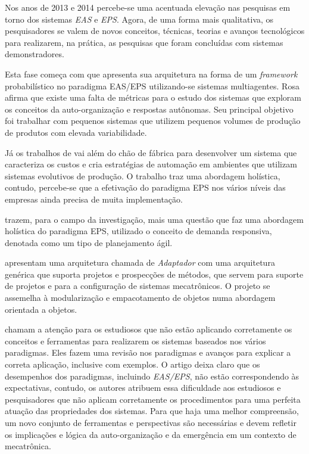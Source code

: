 Nos anos de 2013 e 2014 percebe-se uma acentuada elevação nas pesquisas em torno dos sistemas \textit{EAS} e \textit{EPS}. Agora, de uma forma mais qualitativa, os pesquisadores se valem de novos conceitos, técnicas, teorias e avanços tecnológicos para realizarem, na prática, as pesquisas que foram concluídas com sistemas demonstradores. 

Esta fase começa com \cite{ROSA2013c} que apresenta sua arquitetura na forma de um \textit{framework} probabilístico no paradigma EAS/EPS utilizando-se sistemas multiagentes. Rosa afirma que existe uma falta de métricas para o estudo dos sistemas que exploram os conceitos da auto-organização e respostas autônomas. Seu principal objetivo foi trabalhar com pequenos sistemas que utilizem pequenos volumes de produção de produtos com elevada variabilidade.

Já os trabalhos de \cite{MAFFEI2013, MAFFEI2013j}vai além do chão de fábrica para desenvolver um sistema que caracteriza os custos e cria estratégias de automação em ambientes que utilizam sistemas evolutivos de produção. O trabalho traz uma abordagem holística, contudo, percebe-se que a efetivação do paradigma EPS nos vários níveis das empresas ainda precisa de muita implementação.

\cite{Akillioglu2013} trazem, para o campo da investigação, mais uma questão que faz uma abordagem holística do paradigma EPS, utilizado o conceito de demanda responsiva, denotada como um tipo de planejamento ágil. %

\cite{NEVES2013} apresentam uma arquitetura chamada de \textit{Adaptador} com uma arquitetura genérica que suporta projetos e prospecções de métodos, que servem para suporte de projetos e para a configuração de sistemas mecatrônicos. O projeto se assemelha à modularização e empacotamento de objetos numa abordagem orientada a objetos.

\cite{RIBEIRO2013} chamam a atenção para os estudiosos que não estão aplicando corretamente os conceitos e ferramentas para realizarem os sistemas baseados nos vários paradigmas. Eles fazem uma revisão nos paradigmas e avanços para explicar a correta aplicação, inclusive com exemplos. O artigo deixa claro que os desempenhos dos paradigmas, incluindo \textit{EAS/EPS}, não estão correspondendo às expectativas, contudo, os autores atribuem essa dificuldade aos estudiosos e pesquisadores que não aplicam corretamente os procedimentos para uma perfeita atuação das propriedades dos sistemas. Para que haja uma melhor compreensão, um novo conjunto de ferramentas e perspectivas são necessárias e devem refletir os implicações e lógica da auto-organização e da emergência em um contexto de mecatrônica.


